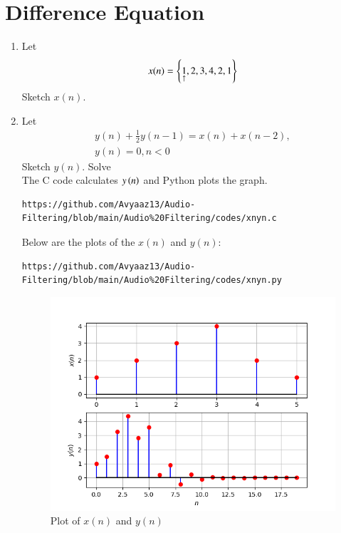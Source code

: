 \documentclass[journal,12pt,twocolumn]{IEEEtran}
\theoremstyle{remark}
\renewcommand\thesection{\arabic{section}}
\numberwithin{equation}{subsection}
\begin{document}
 \section{Difference Equation}
 \begin{enumerate}[label=\thesection.\arabic*,ref=\thesection.\theenumi]
\item Let
\begin{equation}
x(n) = \left\{\underset{\uparrow}{1},2,3,4,2,1\right\} \label{q:2.1}
\end{equation}
Sketch $x(n)$. 
\item Let
\begin{multline}
y(n) + \frac{1}{2}y(n-1) = x(n) + x(n-2),
\\
y(n) = 0, n < 0 \label{q:2.2}
\end{multline}
Sketch $y(n)$.
Solve\\
\solution  The C code calculates $y\left(n\right)$ and Python plots the graph.
\begin{lstlisting}
https://github.com/Avyaaz13/Audio-Filtering/blob/main/Audio%20Filtering/codes/xnyn.c
\end{lstlisting} 
Below are the plots of the $x(n)$ and $y(n)$:
\begin{lstlisting}
https://github.com/Avyaaz13/Audio-Filtering/blob/main/Audio%20Filtering/codes/xnyn.py
\end{lstlisting}

\begin{figure}[!ht]
	\centering
	\includegraphics[width=\columnwidth]{figs/Plot_xnyn.png}
	\caption{Plot of $x(n)$ and $y(n)$}
	\label{fig:xnyn}
\end{figure}
\end{enumerate}
\end{document}
